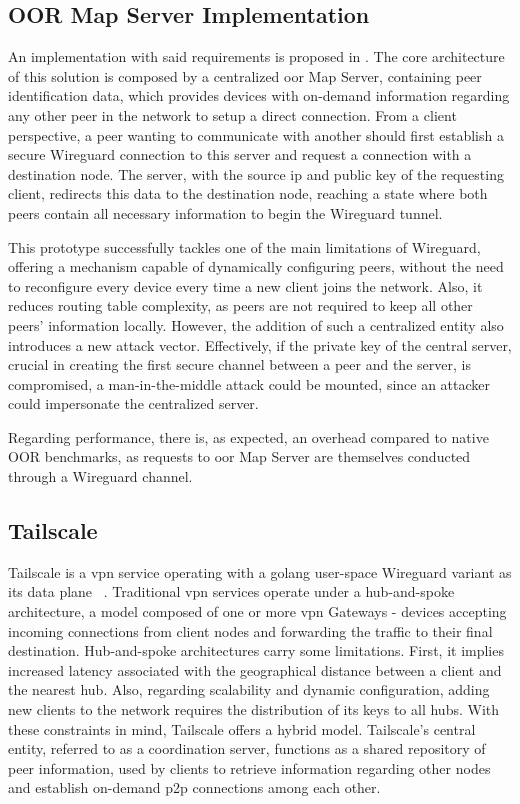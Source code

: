 \documentclass[11pt,twoside,a4paper]{report}
\begin{document}
\subsection{OOR Map Server Implementation}

An implementation with said requirements is proposed in \cite{paillisse2021control}. The core architecture of this solution is composed by a centralized \ac{oor} Map Server, containing peer identification data, which provides devices with on-demand information regarding any other peer in the network to setup a direct connection.  From a client perspective, a peer wanting to communicate with another should first establish a secure Wireguard connection to this server and request a connection with a destination node. The server, with the source \ac{ip} and public key of the requesting client, redirects this data to the destination node, reaching a state where both peers contain all necessary information to begin the Wireguard tunnel.

This prototype successfully tackles one of the main limitations of Wireguard, offering a mechanism capable of dynamically configuring peers, without the need to reconfigure every device every time a new client joins the network. Also, it reduces routing table complexity, as peers are not required to keep all other peers' information locally. However, the addition of such a centralized entity also introduces a new attack vector. Effectively, if the private key of the central server, crucial in creating the first secure channel between a peer and the server, is compromised, a man-in-the-middle attack could be mounted, since an attacker could impersonate the centralized server.

Regarding performance, there is, as expected, an overhead compared to native OOR benchmarks, as requests to \ac{oor} Map Server are themselves conducted through a Wireguard channel.

\subsection{Tailscale}

Tailscale is a \ac{vpn} service operating with a golang user-space Wireguard variant as its data plane ~\cite{tailscale2020online}. Traditional \ac{vpn} services operate under a hub-and-spoke architecture, a model composed of one or more \ac{vpn} Gateways - devices accepting incoming connections from client nodes and forwarding the traffic to their final destination. Hub-and-spoke architectures carry some limitations. First, it implies increased latency associated with the geographical distance between a client and the nearest hub. Also, regarding scalability and dynamic configuration, adding new clients to the network requires the distribution of its keys to all hubs. With these constraints in mind, Tailscale offers a hybrid model. Tailscale's central entity, referred to as a coordination server, functions as a shared repository of peer information, used by clients to retrieve information regarding other nodes and establish on-demand \ac{p2p} connections among each other.
\end{document}
